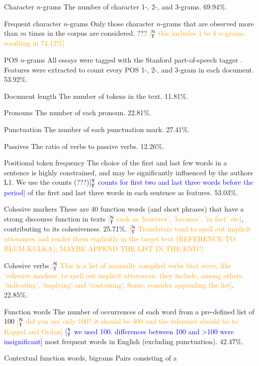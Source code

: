\documentclass[11pt,letterpaper]{article}
\newcommand{\ensuretext}[1]{#1}
\newcommand{\ytmarker}{\ensuretext{\textcolor{blue}{\ensuremath{^{\textsc{Y}}_{\textsc{T}}}}}}
\newcommand{\ntmarker}{\ensuretext{\textcolor{green}{\ensuremath{^{\textsc{N}}_{\textsc{T}}}}}}
\newcommand{\arkcomment}[3]{\ensuretext{\textcolor{#3}{[#1 #2]}}}
\newcommand{\yt}[1]{\arkcomment{\ytmarker}{#1}{blue}}
\newcommand{\nt}[1]{\arkcomment{\ntmarker}{#1}{orange}}
\begin{document}
\begin{compactdesc}
\item[Character $n$-grams] The number of character 1-, 2-, and
  3-grams. 69.94\%.
\item[Frequent character $n$-grams] Only those character $n$-grams
  that are observed more than $m$ times in the corpus are
  considered. ??? \nt{this includes 1 to 4 $n$-grams, resulting in 74.12\%}
\item[POS $n$-grams] All essays were tagged with the Stanford part-of-speech tagger \citep{toutanova-03}.
Features were extracted to count every POS 1-, 2-, and 3-gram in each document. 53.92\%.
\item[Document length] The number of tokens in the text. 11.81\%.
\item[Pronouns] The number of each pronoun. 22.81\%.
\item[Punctuation] The number of each punctuation mark. 27.41\%.
\item[Passives] The ratio of verbs to passive verbs. 12.26\%.
\item[Positional token frequency] The choice of the first and last few
  words in a sentence is highly constrained, and may be significantly
  influenced by the authors L1. We use the counts (???)\yt{counts for first two and last three words before the period} of the first
  and last three words in each sentence as features. 53.03\%.
\item[Cohesive markers] These are 40 function words (and short phrases)
  that have a strong discourse function in texts \nt{such as 'however', 'becuase', 'in fact' etc}, contributing to its
  cohesiveness. 25.71\%. \nt{Translators tend to spell out implicit utterances and render them explicitly in the target text (REFERENCE TO BLUM-KULKA); MAYBE APPEND THE LIST IN THE END?} 
\item[Cohesive verbs] \nt{This is a list of manually compiled verbs that serve, like `cohesive markers' to spell out implicit utterances; they include, among others, `indicating', `implying' and `containing'. Same, consider appending the list}. 22.85\%.
\item[Function words] The number of occurrences of each word from a
  pre-defined list of 100 \nt{did you use only 100? it should be 400 and the reference should be to Koppel and Ordan} \yt{we used 100. differences between 100 and >100 were insignificant} most frequent words in English (excluding
  punctuation). 42.47\%.
\item[Contextual function words, bigrams] Pairs consisting of a

\end{compactdesc}
\end{document}
